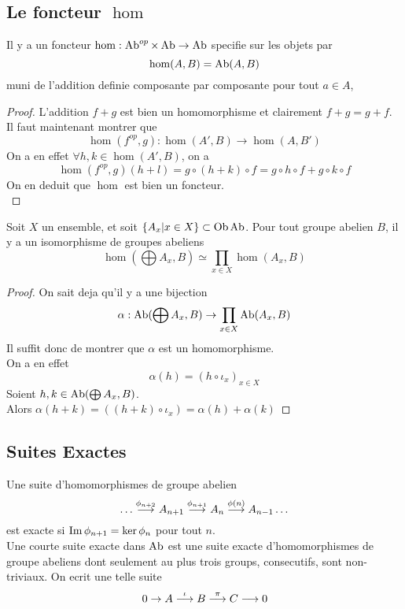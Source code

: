 \documentclass[../main.tex]{subfiles}
\begin{document}
\subsection{Le foncteur $\hom$ }
\begin{lemma}
Il y a un foncteur $\hom: \operatorname{Ab}^{op}\times \operatorname{Ab} \to \operatorname{Ab}$ specifie sur les objets par
\[ 
\hom( A,B) = \operatorname{Ab}( A,B) 
\]
muni de l'addition definie composante par composante pour tout $a \in A$, 
\end{lemma}
\begin{proof}
L'addition $f+g$ est bien un homomorphisme et clairement $f+g = g+f$.\\
Il faut maintenant montrer que
\[ 
\hom( f^{op},g ) : \hom( A',B) \to \hom( A,B')
\]
On a en effet $\forall h, k \in \hom( A',B) $, on a 
\[ 
\hom( f^{op},g) ( h+l) = g\circ ( h+k) \circ f = g\circ h\circ f + g\circ k \circ f
\]
On en deduit que $\hom$ est bien un foncteur.\\

\end{proof}
\begin{propo}
Soit $X$ un ensemble, et soit $ \left\{ A_x| x \in X \right\} \subset \operatorname{Ob} \operatorname{Ab}$. Pour tout groupe abelien $B$, il y a un isomorphisme de groupes abeliens
\[ 
\hom( \bigoplus A_x, B) \simeq \prod_{x\in X} \hom( A_x, B) 
\]

\end{propo}
\begin{proof}
On sait deja qu'il y a une bijection 
\[ 
\alpha: \operatorname{Ab}( \bigoplus A_x, B) \to \prod_{x\in X} \operatorname{Ab}( A_x,B) 
\]
Il suffit donc de montrer que $\alpha$ est un homomorphisme.\\
On a en effet
\[ 
\alpha( h) = ( h\circ \iota_x)_{x\in X} 
\]
Soient $h,k\in \operatorname{Ab}( \bigoplus A_x, B) $.\\
Alors $\alpha( h+k) = ( ( h+k) \circ \iota_x) = \alpha( h) + \alpha( k) $ 
\end{proof}
\subsection{Suites Exactes}
Une suite d'homomorphismes de groupe abelien
\[ 
\ldots \overset{ \phi_{n+2} }{\longrightarrow} A_{n+1} \overset{ \phi_{n+1} }{\longrightarrow} A_n \overset{ \phi( n) }{\longrightarrow} A_{n-1} \ldots
\]
est exacte si $\operatorname{Im}\phi_{n+1} = \ker\phi_n$ pour tout $n$.\\
Une courte suite exacte dans $\operatorname{Ab}$ est une suite exacte d'homomorphismes de groupe abeliens dont seulement au plus trois groups, consecutifs, sont non-triviaux. On ecrit une telle suite
\[ 
0 \to A \overset{\iota}{\longrightarrow} B \overset{\pi}{\longrightarrow} C \overset{}{\longrightarrow} 0
\]
\end{document}
